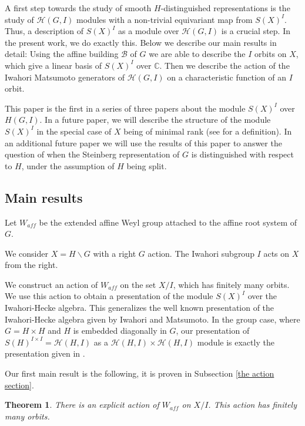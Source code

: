 \documentclass[12pt]{article}
\newcommand{\B}{\mathcal{B}}
\newcommand{\<}{\langle}
\renewcommand{\>}{\rangle}
\theoremstyle{plain}
\newtheorem{theorem}{Theorem}[section] %
\theoremstyle{definition}
\begin{document}
A first step towards the study of smooth $H$-distinguished representations is the study of $\mathcal{H}(G,I)$ modules with a non-trivial equivariant map from $S(X)^I$. Thus, a description of $S(X)^I$  as a module over $\mathcal{H}(G,I)$ is a crucial step. In the present work, we do exactly this. Below we describe our main results in detail: Using the affine building $\B$ of $G$ we are able to describe the $I$ orbits on $X$, which give a linear basis of $S(X)^I$ over $\mathbb{C}$. Then we describe the action of the Iwahori Matsumoto generators of $\mathcal{H}(G,I)$ on a characteristic function of an $I$ orbit.

This paper is the first in a series of three papers about the module $S(X)^I$ over $H(G,I)$. In a future paper, we will describe the structure of the module $S(X)^I$ in the special case of $X$ being of minimal rank (see \cite{RESSAYRE20101784} for a definition). In an additional future paper we will use the results of this paper to answer the question of when the Steinberg representation of $G$ is distinguished with respect to $H$, under the assumption of $H$ being split.

\subsection{Main results}

 Let $W_{aff}$ be the extended affine Weyl group attached to the affine root system of $G$.

 We consider $X=H\backslash G$ with a right $G$ action. The Iwahori subgroup $I$ acts on $X$ from the right.

We construct an action of $W_{aff}$ on the set $X/ I$, which has finitely many orbits. We use this action to obtain a presentation of the module $S(X)^{I}$ over the Iwahori-Hecke algebra. This generalizes the well known presentation of the Iwahori-Hecke algebra given by Iwahori and Matsumoto. In the group case, where $G=H\times H$ and $H$ is embedded diagonally in $G$, our presentation of $S(H)^{I\times I}=\mathcal{H}(H,I)$ as a $\mathcal{H}(H,I)\times \mathcal{H}(H,I)$ module is exactly the presentation given in \cite{PMIHES_1965__25__5_0}.


Our first main result is the following, it is proven in Subsection \ref{the action section}.
\begin{theorem}\label{action} There is an explicit action of $W_{aff}$ on $X/I$. This action has finitely many orbits.
\end{theorem}
\end{document}
